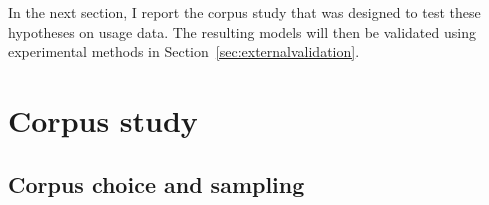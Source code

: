 \documentclass[USenglish]{article}
\begin{document}
\vspace{-1\baselineskip}

In the next section, I report the corpus study that was designed to test these hypotheses on usage data.
The resulting models will then be validated using experimental methods in Section~\ref{sec:externalvalidation}.





\section{Corpus study}
\label{sec:corpusstudies}


\subsection{Corpus choice and sampling}
\label{sec:gettingdata}

\end{document}
